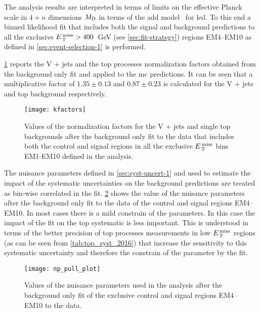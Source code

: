 The analysis results are interpreted in terms of limits on the effective Planck
scale in $4 + n$ dimensions $M_\mathrm{D}$ in terms of the \gls{add}
model~\cite{ADDPaper} for \gls{led}. To this end a binned likelihood fit that
includes both the signal and background predictions to all the exclusive
$E_\mathrm{\, T}^\mathrm{\, miss} > 400$~GeV (see \cref{sec:fit-strategy}) regions EM4--EM10 as defined in
\cref{sec:event-selection-1} is performed.

\cref{fig:kfactors} reports the V + jets and the top processes normalization
factors obtained from the background only fit and applied to the \gls{mc}
predictions. It can be seen that a multiplicative factor of $1.35 \pm 0.13$ and
$0.87 \pm 0.23$ is calculated for the V + jets and top background respectively.
\begin{figure}[!h]
  \centering
  \texttt{[image: kfactors]}
  \caption{Values of the normalization factors for the V + jets and single top
    backgrounds after the background only fit to the data that includes both the
    control and signal regions in all the exclusive $E_\mathrm{\, T}^\mathrm{\, miss}$ bins EM1-EM10 defined
    in the analysis.}
  \label{fig:kfactors}
\end{figure}

The nuisance parameters defined in \cref{sec:syst-uncert-1} and used to estimate
the impact of the systematic uncertainties on the background predictions are
treated as bin-wise correlated in the fit. \cref{fig:np_pull} shows the value of
the nuisance parameters after the background only fit to the data of the control
and signal regions EM4--EM10. In most cases there is a mild constrain of the
parameters. In this case the impact of the fit on the top systematic is less
important. This is understood in terms of the better precision of top processes
measurements in low $E_\mathrm{\, T}^\mathrm{\, miss}$ regions (as can be seen from
\cref{tab:top_syst_2016}) that increase the sensitivity to this systematic
uncertainty and therefore the constrain of the parameter by the fit.
\begin{figure}[!h]
  \centering
  \texttt{[image: np\_pull\_plot]}
  \caption{Values of the nuisance parameters used in the analysis after the
    background only fit of the exclusive control and signal regions EM4--EM10 to
    the data.}
  \label{fig:np_pull}
\end{figure}

